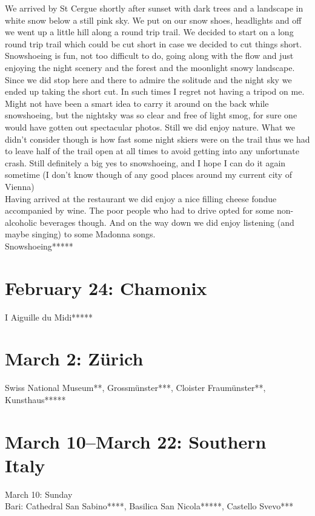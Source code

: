 We arrived by St Cergue shortly after sunset with dark trees and a landscape in white snow below a still pink sky. We put on our snow shoes, headlights and off we went up a little hill along a round trip trail. We decided to start on a long round trip trail which could be cut short in case we decided to cut things short. Snowshoeing is fun, not too difficult to do, going along with the flow and just enjoying the night scenery and the forest and the moonlight snowy landscape. Since we did stop here and there to admire the solitude and the night sky we ended up taking the short cut. In such times I regret not having a tripod on me. Might not have been a smart idea to carry it around on the back while snowshoeing, but the nightsky was so clear and free of light smog, for sure one would have gotten out spectacular photos. Still we did enjoy nature. What we didn't consider though is how fast some night skiers were on the trail thus we had to leave half of the trail open at all times to avoid getting into any unfortunate crash. Still definitely a big yes to snowshoeing, and I hope I can do it again sometime (I don't know though of any good places around my current city of Vienna)\\
Having arrived at the restaurant we did enjoy a nice filling cheese fondue accompanied by wine. The poor people who had to drive opted for some non-alcoholic beverages though. And on the way down we did enjoy listening (and maybe singing) to some Madonna songs.\\

Snowshoeing*****

\section{February 24: Chamonix}
\label{Chamonix2019}
I 
Aiguille du Midi*****

\section{March 2: Z\"urich}
\label{Zurich2019}

Swiss National Museum**, Grossm\"unster***, Cloister Fraum\"unster**, Kunsthaus*****

\section{March 10--March 22: Southern Italy}
\label{SouthItaly2019}

March 10: Sunday\\
Bari: Cathedral San Sabino****, Basilica San Nicola*****,  Castello Svevo***\\

